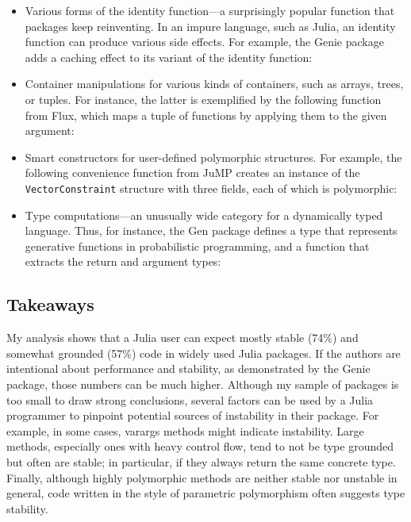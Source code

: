 \documentclass[oneside,openright,titlepage,numbers=noenddot,%
headinclude,footinclude,cleardoublepage=empty,abstract=on,
BCOR=5mm,paper=a4,fontsize=11pt,
dvipsnames
]{scrreprt}
\renewcommand{\c}[1]{\lstinline[language=Julia]!#1!\xspace}
\begin{document}
\begin{itemize}
\item
  Various forms of the identity function---a surprisingly popular function that
  packages keep reinventing. In an impure language, such as Julia, an identity
  function can produce various side effects.
  For example, the Genie package adds a caching effect to
  its variant of the identity function:

\item
  Container manipulations for various kinds of containers, such as arrays, trees, or
  tuples. For instance, the latter is exemplified by the following function
  from Flux, which maps a tuple of functions by applying them to the given argument:

\item
  Smart constructors for user-defined polymorphic structures. For example, the following
  convenience function from JuMP creates an instance of the
  \c{VectorConstraint} structure with three fields, each of which is polymorphic:

\item
  Type computations---an unusually wide category for a dynamically typed
  language. Thus, for instance, the Gen package defines a type that represents generative
  functions in probabilistic programming, and a function that extracts the
  return and argument types:

\end{itemize}

\subsection{Takeaways}

My analysis shows that a Julia user can expect mostly stable (74\%) and
somewhat grounded (57\%) code in widely used Julia packages. If the authors
are intentional about performance and stability, as demonstrated by the Genie
package, those numbers can be much higher. Although my sample of packages is
too small to draw strong conclusions, several factors can be
used by a Julia programmer to pinpoint potential sources of instability in their
package. For example, in some cases, varargs methods might indicate instability.
Large methods, especially ones with heavy control flow,
tend to not be type grounded but often are stable; in particular,
if they always return the same concrete type.
Finally, although highly polymorphic methods are neither stable nor unstable
in general, code written in the style of parametric polymorphism
often suggests type stability.
\end{document}
